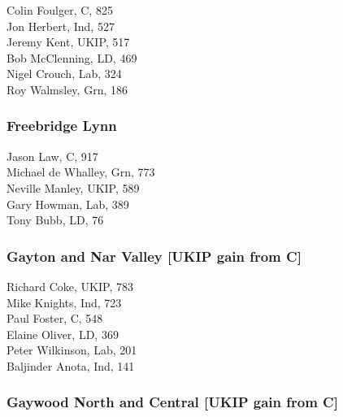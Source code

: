 \documentclass[a4paper,openany,10pt]{book}
\begin{document}
Colin Foulger, C, 825\\
Jon Herbert, Ind, 527\\
Jeremy Kent, UKIP, 517\\
Bob McClenning, LD, 469\\
Nigel Crouch, Lab, 324\\
Roy Walmsley, Grn, 186\\


\subsubsection*{Freebridge Lynn}



Jason Law, C, 917\\
Michael de Whalley, Grn, 773\\
Neville Manley, UKIP, 589\\
Gary Howman, Lab, 389\\
Tony Bubb, LD, 76\\


\subsubsection*{Gayton and Nar Valley \hspace*{\fill}\nolinebreak[1]%
\enspace\hspace*{\fill}
[UKIP gain from C]}



Richard Coke, UKIP, 783\\
Mike Knights, Ind, 723\\
Paul Foster, C, 548\\
Elaine Oliver, LD, 369\\
Peter Wilkinson, Lab, 201\\
Baljinder Anota, Ind, 141\\


\subsubsection*{Gaywood North and Central \hspace*{\fill}\nolinebreak[1]%
\enspace\hspace*{\fill}
[UKIP gain from C]}

\end{document}
